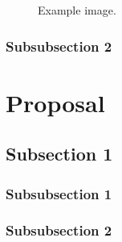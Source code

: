 \documentclass[12pt]{article} %
\begin{document}
\begin{figure}[H] %
\caption{Example image.}
\label{fig:speciation}
\end{figure}


\subsubsection{Subsubsection 2} %

\lipsum[4] %


\section{Proposal} %

\lipsum[5] %


\subsection{Subsection 1} %

\subsubsection{Subsubsection 1} %

\lipsum[6] %


\subsubsection{Subsubsection 2} %
\end{document}
